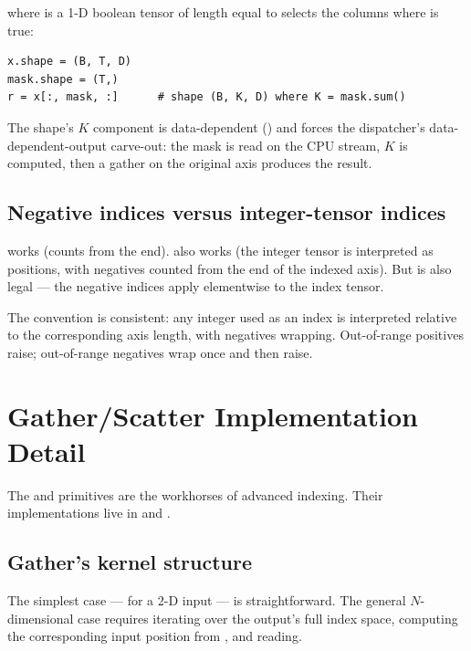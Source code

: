 where  is a 1-D boolean tensor of
length equal to  selects the columns where
 is true:

\begin{lstlisting}[style=lucid,language=LucidPython]
x.shape = (B, T, D)
mask.shape = (T,)
r = x[:, mask, :]      # shape (B, K, D) where K = mask.sum()
\end{lstlisting}

The shape's $K$ component is data-dependent ()
and forces the dispatcher's data-dependent-output carve-out: the
mask is read on the CPU stream, $K$ is computed, then a gather
on the original axis produces the result.

\subsection{Negative indices versus integer-tensor indices}
\label{ssec:indexing:neg_indices}

 works (counts from the end). 
also works (the integer tensor is interpreted as positions, with
negatives counted from the end of the indexed axis). But
 is also legal --- the negative
indices apply elementwise to the index tensor.

The convention is consistent: any integer used as an index is
interpreted relative to the corresponding axis length, with
negatives wrapping. Out-of-range positives raise; out-of-range
negatives wrap once and then raise.

\section{Gather/Scatter Implementation Detail}
\label{sec:indexing:gather_scatter_impl}

The  and  primitives are the workhorses
of advanced indexing. Their implementations live in
 and
.

\subsection{Gather's kernel structure}
\label{ssec:indexing:gather_struct}

The simplest case ---  for a 2-D
input --- is straightforward. The general $N$-dimensional case
requires iterating over the output's full index space, computing
the corresponding input position from , and reading.

